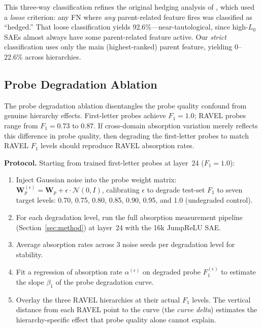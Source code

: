 \documentclass{article}
\begin{document}
This three-way classification refines the original hedging analysis of \citet{chanin2024absorption}, which used a \emph{loose} criterion: any FN where \emph{any} parent-related feature fires was classified as ``hedged.'' That loose classification yields 92.6\%---near-tautological, since high-$L_0$ SAEs almost always have some parent-related feature active. Our \emph{strict} classification uses only the main (highest-ranked) parent feature, yielding 0--22.6\% across hierarchies.

\subsection{Probe Degradation Ablation}
\label{sec:probe_degradation_method}

The probe degradation ablation disentangles the probe quality confound from genuine hierarchy effects. First-letter probes achieve $F_1 = 1.0$; RAVEL probes range from $F_1 = 0.73$ to $0.87$. If cross-domain absorption variation merely reflects this difference in probe quality, then degrading the first-letter probes to match RAVEL $F_1$ levels should reproduce RAVEL absorption rates.

\textbf{Protocol.} Starting from trained first-letter probes at layer~24 ($F_1 = 1.0$):

\begin{enumerate}
\item Inject Gaussian noise into the probe weight matrix: $\mathbf{W}_p^{(\epsilon)} = \mathbf{W}_p + \epsilon \cdot \mathcal{N}(0, I)$, calibrating $\epsilon$ to degrade test-set $F_1$ to seven target levels: 0.70, 0.75, 0.80, 0.85, 0.90, 0.95, and 1.0 (undegraded control).
\item For each degradation level, run the full absorption measurement pipeline (Section~\ref{sec:method}) at layer~24 with the 16k JumpReLU SAE.
\item Average absorption rates across 3 noise seeds per degradation level for stability.
\item Fit a regression of absorption rate $\alpha^{(\epsilon)}$ on degraded probe $F_1^{(\epsilon)}$ to estimate the slope $\beta_1$ of the probe degradation curve.
\item Overlay the three RAVEL hierarchies at their actual $F_1$ levels. The vertical distance from each RAVEL point to the curve (the \emph{curve delta}) estimates the hierarchy-specific effect that probe quality alone cannot explain.
\end{enumerate}
\end{document}

